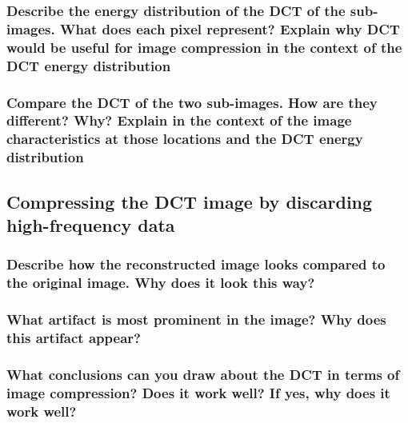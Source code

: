 \subsubsection{Describe the energy distribution of the DCT of the sub-images. What does each pixel represent? Explain why DCT would be useful for image compression in the context of the DCT energy distribution}

\subsubsection{Compare the DCT of the two sub-images. How are they different? Why? Explain in the context of the image characteristics at those locations and the DCT energy distribution}

\subsection{Compressing the DCT image by discarding high-frequency data}

\subsubsection{Describe how the reconstructed image looks compared to the original image. Why does it look this way?}

\subsubsection{What artifact is most prominent in the image? Why does this artifact appear?}

\subsubsection{What conclusions can you draw about the DCT in terms of image compression? Does it work well? If yes, why does it work well?}